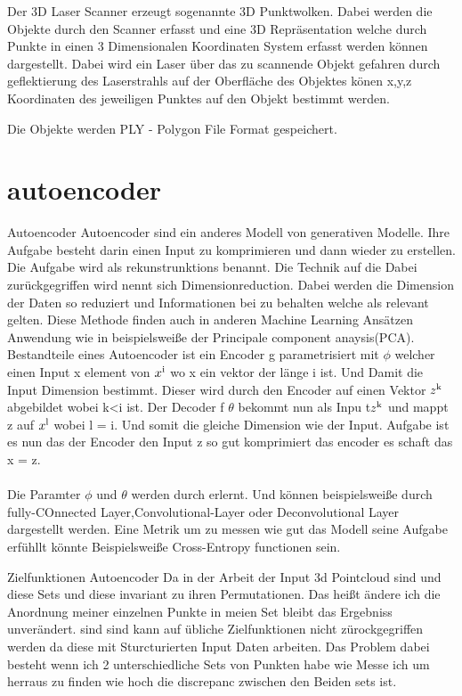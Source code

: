 \documentclass{llncs}
\begin{document}
Der 3D Laser Scanner erzeugt sogenannte 3D Punktwolken. Dabei werden die Objekte durch den Scanner erfasst und eine 3D Repräsentation welche durch Punkte in einen 3 Dimensionalen Koordinaten System erfasst werden können dargestellt. Dabei wird ein Laser über das zu scannende Objekt gefahren durch geflektierung des Laserstrahls auf der Oberfläche des Objektes könen x,y,z Koordinaten des jeweiligen Punktes auf den Objekt bestimmt werden.

Die Objekte werden PLY - Polygon File Format gespeichert.

\section{autoencoder}
Autoencoder
Autoencoder sind ein anderes Modell von generativen Modelle. Ihre Aufgabe besteht darin einen Input zu komprimieren und dann wieder zu erstellen. Die Aufgabe wird als rekunstrunktions benannt. 
Die Technik auf die Dabei zurückgegriffen wird nennt sich Dimensionreduction. Dabei werden die Dimension der Daten so reduziert und Informationen bei zu behalten welche als relevant gelten. Diese Methode finden auch in anderen Machine Learning Ansätzen Anwendung wie in beispielsweiße der Principale component anaysis(PCA). Bestandteile eines Autoencoder ist ein Encoder g parametrisiert mit $\phi$ welcher einen Input x element von $x\textsuperscript{i}$ wo x ein vektor der länge i ist. Und Damit die Input Dimension bestimmt. Dieser wird durch den Encoder auf einen Vektor $z\textsuperscript{k}$ abgebildet wobei k<i ist. Der Decoder f $\theta$ bekommt nun als Inpu t$z\textsuperscript{k}$ und mappt z auf $x\textsuperscript{l}$ wobei l = i. Und somit die gleiche Dimension wie der Input. Aufgabe ist es nun das der Encoder den Input z so gut komprimiert das encoder es schaft das x = z. 
\\\\
Die Paramter $\phi$ und $\theta$ werden durch erlernt. Und können beispielsweiße durch fully-COnnected Layer,Convolutional-Layer oder Deconvolutional Layer dargestellt werden. Eine Metrik um zu messen wie gut das Modell seine Aufgabe erfühllt könnte Beispielsweiße Cross-Entropy functionen sein. 

Zielfunktionen Autoencoder
Da in der Arbeit der Input 3d Pointcloud sind und diese Sets und diese invariant zu ihren Permutationen. Das heißt ändere ich die Anordnung meiner einzelnen Punkte in meien Set bleibt das Ergebniss unverändert.  sind sind kann auf übliche Zielfunktionen nicht zürockgegriffen werden da diese mit Sturcturierten Input Daten arbeiten. Das Problem dabei besteht wenn ich 2 unterschiedliche Sets von Punkten habe wie Messe ich um herraus zu finden wie hoch die discrepanc zwischen den Beiden sets ist. 
\end{document}
